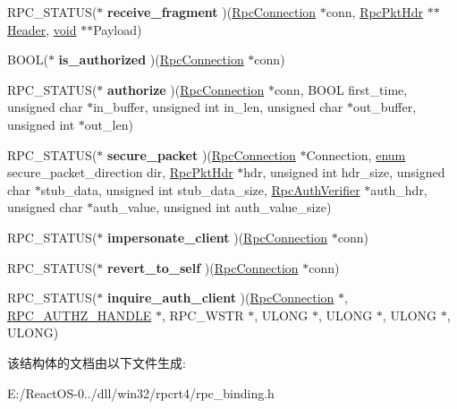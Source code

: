 \begin{DoxyCompactItemize}
R\+P\+C\+\_\+\+S\+T\+A\+T\+US($\ast$ {\bfseries receive\+\_\+fragment} )(\hyperlink{struct___rpc_connection}{Rpc\+Connection} $\ast$conn, \hyperlink{union_rpc_pkt_hdr}{Rpc\+Pkt\+Hdr} $\ast$$\ast$\hyperlink{class_header}{Header}, \hyperlink{interfacevoid}{void} $\ast$$\ast$Payload)
\item 
\mbox{\label{structconnection__ops_ac460ba448a2a0befc41f7a627f00e795}} 
B\+O\+OL($\ast$ {\bfseries is\+\_\+authorized} )(\hyperlink{struct___rpc_connection}{Rpc\+Connection} $\ast$conn)
\item 
\mbox{\label{structconnection__ops_a387bc77e6eaf89ce9b3f76daae1df048}} 
R\+P\+C\+\_\+\+S\+T\+A\+T\+US($\ast$ {\bfseries authorize} )(\hyperlink{struct___rpc_connection}{Rpc\+Connection} $\ast$conn, B\+O\+OL first\+\_\+time, unsigned char $\ast$in\+\_\+buffer, unsigned int in\+\_\+len, unsigned char $\ast$out\+\_\+buffer, unsigned int $\ast$out\+\_\+len)
\item 
\mbox{\label{structconnection__ops_a278b757a36c56d30f6bb8282db6e2ac5}} 
R\+P\+C\+\_\+\+S\+T\+A\+T\+US($\ast$ {\bfseries secure\+\_\+packet} )(\hyperlink{struct___rpc_connection}{Rpc\+Connection} $\ast$Connection, \hyperlink{interfaceenum}{enum} secure\+\_\+packet\+\_\+direction dir, \hyperlink{union_rpc_pkt_hdr}{Rpc\+Pkt\+Hdr} $\ast$hdr, unsigned int hdr\+\_\+size, unsigned char $\ast$stub\+\_\+data, unsigned int stub\+\_\+data\+\_\+size, \hyperlink{struct_rpc_auth_verifier}{Rpc\+Auth\+Verifier} $\ast$auth\+\_\+hdr, unsigned char $\ast$auth\+\_\+value, unsigned int auth\+\_\+value\+\_\+size)
\item 
\mbox{\label{structconnection__ops_ac1632e4db8047aeea6d21a41b8490027}} 
R\+P\+C\+\_\+\+S\+T\+A\+T\+US($\ast$ {\bfseries impersonate\+\_\+client} )(\hyperlink{struct___rpc_connection}{Rpc\+Connection} $\ast$conn)
\item 
\mbox{\label{structconnection__ops_a9dbe5bb396520af2a57cfb14eceaa527}} 
R\+P\+C\+\_\+\+S\+T\+A\+T\+US($\ast$ {\bfseries revert\+\_\+to\+\_\+self} )(\hyperlink{struct___rpc_connection}{Rpc\+Connection} $\ast$conn)
\item 
\mbox{\label{structconnection__ops_a9e822716d8dfce83938a6977a858f88b}} 
R\+P\+C\+\_\+\+S\+T\+A\+T\+US($\ast$ {\bfseries inquire\+\_\+auth\+\_\+client} )(\hyperlink{struct___rpc_connection}{Rpc\+Connection} $\ast$, \hyperlink{interfacevoid}{R\+P\+C\+\_\+\+A\+U\+T\+H\+Z\+\_\+\+H\+A\+N\+D\+LE} $\ast$, R\+P\+C\+\_\+\+W\+S\+TR $\ast$, U\+L\+O\+NG $\ast$, U\+L\+O\+NG $\ast$, U\+L\+O\+NG $\ast$, U\+L\+O\+NG)
\end{DoxyCompactItemize}


该结构体的文档由以下文件生成\+:\begin{DoxyCompactItemize}
\item 
E\+:/\+React\+O\+S-\/0../dll/win32/rpcrt4/rpc\+\_\+binding.\+h\end{DoxyCompactItemize}
